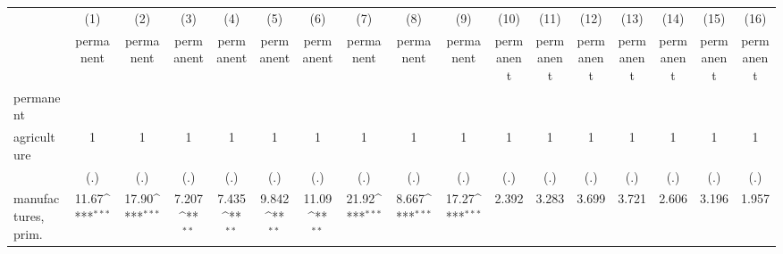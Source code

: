 {
\def\sym#1{\ifmmode^{#1}\else\(^{#1}\)\fi}
\begin{tabular}{l*{16}{c}}
\hline\hline
                    &\multicolumn{1}{c}{(1)}&\multicolumn{1}{c}{(2)}&\multicolumn{1}{c}{(3)}&\multicolumn{1}{c}{(4)}&\multicolumn{1}{c}{(5)}&\multicolumn{1}{c}{(6)}&\multicolumn{1}{c}{(7)}&\multicolumn{1}{c}{(8)}&\multicolumn{1}{c}{(9)}&\multicolumn{1}{c}{(10)}&\multicolumn{1}{c}{(11)}&\multicolumn{1}{c}{(12)}&\multicolumn{1}{c}{(13)}&\multicolumn{1}{c}{(14)}&\multicolumn{1}{c}{(15)}&\multicolumn{1}{c}{(16)}\\
                    &\multicolumn{1}{c}{permanent}&\multicolumn{1}{c}{permanent}&\multicolumn{1}{c}{permanent}&\multicolumn{1}{c}{permanent}&\multicolumn{1}{c}{permanent}&\multicolumn{1}{c}{permanent}&\multicolumn{1}{c}{permanent}&\multicolumn{1}{c}{permanent}&\multicolumn{1}{c}{permanent}&\multicolumn{1}{c}{permanent}&\multicolumn{1}{c}{permanent}&\multicolumn{1}{c}{permanent}&\multicolumn{1}{c}{permanent}&\multicolumn{1}{c}{permanent}&\multicolumn{1}{c}{permanent}&\multicolumn{1}{c}{permanent}\\
\hline
permanent           &                     &                     &                     &                     &                     &                     &                     &                     &                     &                     &                     &                     &                     &                     &                     &                     \\
agriculture         &           1         &           1         &           1         &           1         &           1         &           1         &           1         &           1         &           1         &           1         &           1         &           1         &           1         &           1         &           1         &           1         \\
                    &         (.)         &         (.)         &         (.)         &         (.)         &         (.)         &         (.)         &         (.)         &         (.)         &         (.)         &         (.)         &         (.)         &         (.)         &         (.)         &         (.)         &         (.)         &         (.)         \\
[1em]
manufactures, prim. &       11.67\sym{***}&       17.90\sym{***}&       7.207\sym{**} &       7.435\sym{**} &       9.842\sym{**} &       11.09\sym{**} &       21.92\sym{***}&       8.667\sym{***}&       17.27\sym{***}&       2.392         &       3.283         &       3.699         &       3.721         &       2.606         &       3.196         &       1.957         \\

\end{tabular}}

